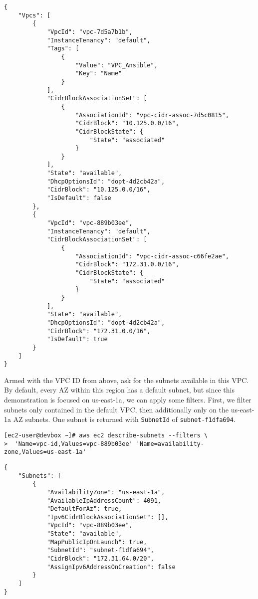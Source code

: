 \begin{verbatim}
{
    "Vpcs": [
        {
            "VpcId": "vpc-7d5a7b1b", 
            "InstanceTenancy": "default", 
            "Tags": [
                {
                    "Value": "VPC_Ansible", 
                    "Key": "Name"
                }
            ], 
            "CidrBlockAssociationSet": [
                {
                    "AssociationId": "vpc-cidr-assoc-7d5c0815", 
                    "CidrBlock": "10.125.0.0/16", 
                    "CidrBlockState": {
                        "State": "associated"
                    }
                }
            ], 
            "State": "available", 
            "DhcpOptionsId": "dopt-4d2cb42a", 
            "CidrBlock": "10.125.0.0/16", 
            "IsDefault": false
        }, 
        {
            "VpcId": "vpc-889b03ee", 
            "InstanceTenancy": "default", 
            "CidrBlockAssociationSet": [
                {
                    "AssociationId": "vpc-cidr-assoc-c66fe2ae", 
                    "CidrBlock": "172.31.0.0/16", 
                    "CidrBlockState": {
                        "State": "associated"
                    }
                }
            ], 
            "State": "available", 
            "DhcpOptionsId": "dopt-4d2cb42a", 
            "CidrBlock": "172.31.0.0/16", 
            "IsDefault": true
        }
    ]
}
\end{verbatim}

Armed with the VPC ID from above, ask for the subnets available in this VPC\@.
By default, every AZ within this region has a default subnet, but since this
demonstration is focused on us-east-1a, we can apply some filters. First, we
filter subnets only contained in the default VPC, then additionally only on
the us-east-1a AZ subnets. One subnet is returned with \verb|SubnetId|
of \verb|subnet-f1dfa694|.

\begin{verbatim}
[ec2-user@devbox ~]# aws ec2 describe-subnets --filters \
>  'Name=vpc-id,Values=vpc-889b03ee' 'Name=availability-zone,Values=us-east-1a'
\end{verbatim}

\begin{verbatim}
{
    "Subnets": [
        {
            "AvailabilityZone": "us-east-1a", 
            "AvailableIpAddressCount": 4091, 
            "DefaultForAz": true, 
            "Ipv6CidrBlockAssociationSet": [], 
            "VpcId": "vpc-889b03ee", 
            "State": "available", 
            "MapPublicIpOnLaunch": true, 
            "SubnetId": "subnet-f1dfa694", 
            "CidrBlock": "172.31.64.0/20", 
            "AssignIpv6AddressOnCreation": false
        }
    ]
}
\end{verbatim}

